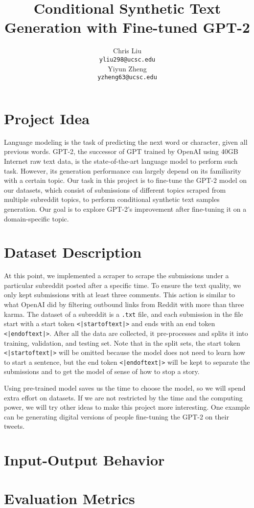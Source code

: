 \documentclass[10pt]{article}
\title{Conditional Synthetic Text Generation with Fine-tuned GPT-2}
\author{
 Chris Liu \\
    \texttt{yliu298@ucsc.edu} \\
 \And
 Yiyun Zheng \\
    \texttt{yzheng63@ucsc.edu}
}
\begin{document}
\maketitle
\section{Project Idea}

Language modeling is the task of predicting the next word or character, given all previous words. GPT-2, the successor of GPT \cite{radford2018improving} trained by OpenAI \cite{radford2019language} using 40GB Internet raw text data, is the state-of-the-art language model to perform such task. However, its generation performance can largely depend on its familiarity with a certain topic. Our task in this project is to fine-tune the GPT-2 model on our datasets, which consist of submissions of different topics scraped from multiple subreddit topics, to perform conditional synthetic text samples generation. Our goal is to explore GPT-2's improvement after fine-tuning it on a domain-specific topic.

\section{Dataset Description}

At this point, we implemented a scraper to scrape the submissions under a particular subreddit posted after a specific time. To ensure the text quality, we only kept submissions with at least three comments. This action is similar to what OpenAI did by filtering outbound links from Reddit with more than three karma. The dataset of a subreddit is a \texttt{.txt} file, and each submission in the file start with a start token \texttt{<|startoftext|>} and ends with an end token \texttt{<|endoftext|>}. After all the data are collected, it pre-processes and splits it into training, validation, and testing set. Note that in the split sets, the start token \texttt{<|startoftext|>} will be omitted because the model does not need to learn how to start a sentence, but the end token \texttt{<|endoftext|>} will be kept to separate the submissions and to get the model of sense of how to stop a story.

Using pre-trained model saves us the time to choose the model, so we will spend extra effort on datasets. If we are not restricted by the time and the computing power, we will try other ideas to make this project more interesting. One example can be generating digital versions of people fine-tuning the GPT-2 on their tweets.

\section{Input-Output Behavior}

\section{Evaluation Metrics}

\clearpage

\printbibliography 
\end{document}
